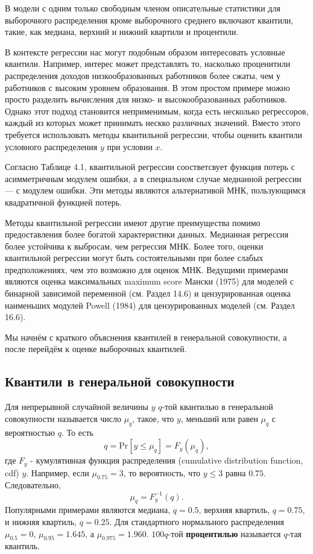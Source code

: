 В модели с одним только свободным членом описательные статистики для выборочного распределения кроме выборочного среднего включают квантили, такие, как медиана, верхний и нижний квартили и процентили.

В контексте регрессии нас могут подобным образом интересовать условные квантили. Например, интерес может представлять то, насколько проценитили распределения доходов низкообразованных работников более сжаты, чем у работников с высоким уровнем образования. В этом простом примере можно просто разделить вычисления для низко- и высокообразованных работников. Однако этот подход становится неприменимым, когда есть несколько регрессоров, каждый из которых может принимать нескко различных значений. Вместо этого требуется использовать методы квантильной регрессии, чтобы оценить квантили условного распределения $y$ при условии $x$.

Согласно Таблице 4.1, квантильной регрессии соостветсвует функция потерь с асимметричным модулем ошибки, а в специальном случае медианной регрессии --- с модулем ошибки. Эти методы являются альтернативой МНК, пользующимся квадратичной функцией потерь.

Методы квантильной регрессии имеют другие преимущества помимо предоставления более богатой характеристики данных. Медианная регрессия более устойчива к выбросам, чем регрессия МНК. Более того, оценки квантильной регрессии могут быть состоятельными при более слабых предположениях, чем это возможно для оценок МНК. Ведущими примерами являются оценка максимальных maximum score Мански (1975) для моделей с бинарной зависимой переменной (см. Раздел 14.6) и цензурированная оценка наименьших модулей Powell (1984) для цензурированных моделей (см. Раздел 16.6).

Мы начнём с краткого объяснения квантилей в генеральной совокупности, а после перейдём к оценке выборочных квантилей.

\subsection{Квантили в генеральной совокупности}

Для непрерывной случайной величины $y$ $q$-той квантилью в генеральной совокупности называется число $\mu_q$, такое, что $y$, меньший или равен $\mu_q$ с вероятностью $q$. То есть
$$
q = \mathrm{Pr}[y \leq \mu_q] = F_y(\mu_q),
$$
где $F_y$ - кумулятивная функция распределения (cumulative distribution function, cdf) $y$. Например, если $\mu_{0.75}=3$, то вероятность, что $y\leq 3$ равна $0.75$. Следовательно,
$$
\mu_q = F_y^{-1}(q).
$$
Популярными примерами являются медиана, $q=0.5$, верхняя квартиль, $q=0.75$, и нижняя квартиль, $q=0.25$. Для стандартного нормального распределения $\mu_{0.5}=0$, $\mu_{0.95}=1.645$, а $\mu_{0.975}=1.960$.  $100q$-той \textbf{процентилью} называется $q$-тая квантиль.

